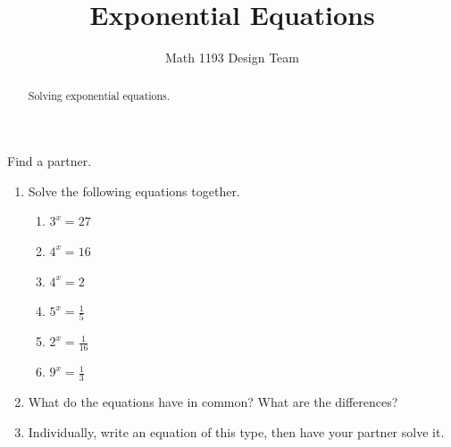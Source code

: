 \documentclass[noauthor]{ximera}
\title{Exponential Equations}
\author{Math 1193 Design Team}
\begin{document}
\begin{abstract}
    Solving exponential equations.
\end{abstract}
\maketitle

Find a partner.

\begin{enumerate}
    \item Solve the following equations together.
    \begin{enumerate}
        \item \(3^x = 27\)
        \item \(4^x = 16\)
        \item \(4^x = 2\)
        \item \(5^x = \frac{1}{5}\)
        \item \(2^x = \frac{1}{16}\)
        \item \(9^x = \frac{1}{3}\)
    \end{enumerate}
    \item What do the equations have in common? What are the differences?
    \item Individually, write an equation of this type, then have your partner solve it.
\end{enumerate}
\end{document}
